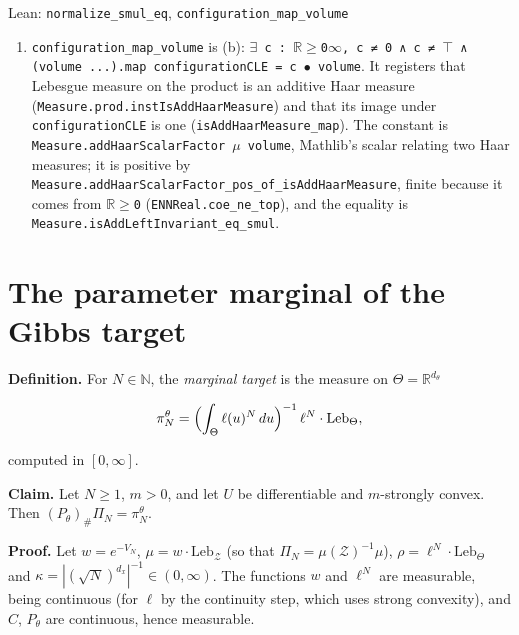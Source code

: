 \documentclass[11pt,a4paper]{article}
\begin{document}
\begin{leanbox}{Lean: \texttt{normalize\_\allowbreak{}smul\_\allowbreak{}eq}, \texttt{configuration\_\allowbreak{}map\_\allowbreak{}volume}}
\begin{enumerate}
\item \texttt{configuration\_\allowbreak{}map\_\allowbreak{}volume} is (b): \texttt{\ensuremath{\exists} c : \ensuremath{\mathbb R}\ensuremath{\ge}0\ensuremath{\infty}, c ≠ 0 ∧ c ≠ \ensuremath{\top} ∧ (volume .\allowbreak{}.\allowbreak{}.\allowbreak{}).\allowbreak{}map configuration\allowbreak{}CLE = c \ensuremath{\bullet} volume}. It registers that Lebesgue measure on the product is an additive Haar measure (\texttt{Measure.\allowbreak{}prod.\allowbreak{}inst\allowbreak{}Is\allowbreak{}Add\allowbreak{}Haar\allowbreak{}Measure}) and that its image under \texttt{configuration\allowbreak{}CLE} is one (\texttt{is\allowbreak{}Add\allowbreak{}Haar\allowbreak{}Measure\_\allowbreak{}map}). The constant is \texttt{Measure.\allowbreak{}add\allowbreak{}Haar\allowbreak{}Scalar\allowbreak{}Factor \ensuremath{\mu} volume}, Mathlib's scalar relating two Haar measures; it is positive by \texttt{Measure.\allowbreak{}add\allowbreak{}Haar\allowbreak{}Scalar\allowbreak{}Factor\_\allowbreak{}pos\_\allowbreak{}of\_\allowbreak{}is\allowbreak{}Add\allowbreak{}Haar\allowbreak{}Measure}, finite because it comes from \texttt{\ensuremath{\mathbb R}\ensuremath{\ge}0} (\texttt{ENNReal.\allowbreak{}coe\_\allowbreak{}ne\_\allowbreak{}top}), and the equality is \texttt{Measure.\allowbreak{}is\allowbreak{}Add\allowbreak{}Left\allowbreak{}Invariant\_\allowbreak{}eq\_\allowbreak{}smul}.

\end{enumerate}
\end{leanbox}

\section{\texorpdfstring{The parameter marginal of the Gibbs target}{The parameter marginal of the Gibbs target}}


\textbf{Definition.} For \(N\in\mathbb N\), the \emph{marginal target} is the measure on \(\Theta=\mathbb R^{d_\theta}\)


\[\pi_N^\theta=\Bigl(\int_\Theta\ell(u)^N\,du\Bigr)^{-1}\,\ell^N\cdot\mathrm{Leb}_\Theta,\]


computed in \([0,\infty]\).




\textbf{Claim.} Let \(N\ge1\), \(m>0\), and let \(U\) be differentiable and \(m\)-strongly convex. Then \((P_\theta)_\#\Pi_N=\pi_N^\theta\).




\textbf{Proof.} Let \(w=e^{-V_N}\), \(\mu=w\cdot\mathrm{Leb}_{\mathcal Z}\) (so that \(\Pi_N=\mu(\mathcal Z)^{-1}\mu\)), \(\rho=\ell^N\cdot\mathrm{Leb}_\Theta\) and \(\kappa=|(\sqrt N)^{d_x}|^{-1}\in(0,\infty)\). The functions \(w\) and \(\ell^N\) are measurable, being continuous (for \(\ell\) by the continuity step, which uses strong convexity), and \(C\), \(P_\theta\) are continuous, hence measurable.
\end{document}
